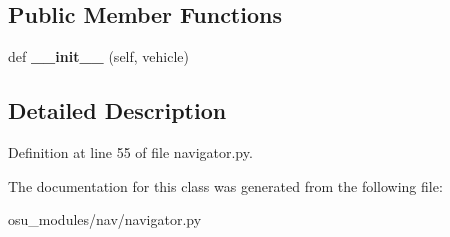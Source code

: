 \subsection*{Public Member Functions}
\begin{DoxyCompactItemize}
\item 
\mbox{\label{classscripts_1_1osu__modules_1_1nav_1_1navigator_1_1Nav_ad68198012c790649bb64f029198150c7}} 
def {\bfseries \+\_\+\+\_\+init\+\_\+\+\_\+} (self, vehicle)
\end{DoxyCompactItemize}


\subsection{Detailed Description}


Definition at line 55 of file navigator.\+py.



The documentation for this class was generated from the following file\+:\begin{DoxyCompactItemize}
\item 
osu\+\_\+modules/nav/navigator.\+py\end{DoxyCompactItemize}

